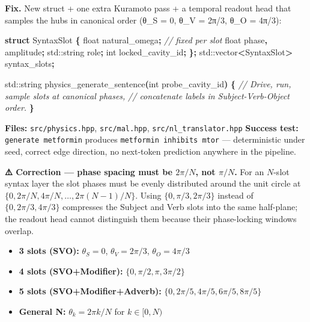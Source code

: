 \documentclass[
  11pt,
  a4paper,
]{article}
\newenvironment{Shaded}{\begin{snugshade}}{\end{snugshade}}
\newcommand{\BuiltInTok}[1]{#1}
\newcommand{\CommentTok}[1]{\textcolor[rgb]{0.56,0.35,0.01}{\textit{#1}}}
\newcommand{\DataTypeTok}[1]{\textcolor[rgb]{0.13,0.29,0.53}{#1}}
\newcommand{\KeywordTok}[1]{\textcolor[rgb]{0.13,0.29,0.53}{\textbf{#1}}}
\newcommand{\NormalTok}[1]{#1}
\newcommand{\OperatorTok}[1]{\textcolor[rgb]{0.81,0.36,0.00}{\textbf{#1}}}
\providecommand{\tightlist}{%
  \setlength{\itemsep}{0pt}\setlength{\parskip}{0pt}}
\begin{document}
\textbf{Fix.} New struct + one extra Kuramoto pass + a temporal readout
head that samples the hubs in canonical order (θ\_S = 0, θ\_V = 2π/3,
θ\_O = 4π/3):

\begin{Shaded}
\begin{Highlighting}[]
\KeywordTok{struct}\NormalTok{ SyntaxSlot }\OperatorTok{\{}
    \DataTypeTok{float}\NormalTok{ natural\_omega}\OperatorTok{;}   \CommentTok{// fixed per slot}
    \DataTypeTok{float}\NormalTok{ phase}\OperatorTok{,}\NormalTok{ amplitude}\OperatorTok{;}
    \BuiltInTok{std::}\NormalTok{string role}\OperatorTok{;}
    \DataTypeTok{int}\NormalTok{ locked\_cavity\_id}\OperatorTok{;}
\OperatorTok{\};}
\BuiltInTok{std::}\NormalTok{vector}\OperatorTok{\textless{}}\NormalTok{SyntaxSlot}\OperatorTok{\textgreater{}}\NormalTok{ syntax\_slots}\OperatorTok{;}

\BuiltInTok{std::}\NormalTok{string physics\_generate\_sentence}\OperatorTok{(}\DataTypeTok{int}\NormalTok{ probe\_cavity\_id}\OperatorTok{)} \OperatorTok{\{}
    \CommentTok{// Drive, run, sample slots at canonical phases,}
    \CommentTok{// concatenate labels in Subject{-}Verb{-}Object order.}
\OperatorTok{\}}
\end{Highlighting}
\end{Shaded}

\textbf{Files:} \texttt{src/physics.hpp}, \texttt{src/mal.hpp},
\texttt{src/nl\_translator.hpp} \textbf{Success test:}
\texttt{generate\ metformin} produces \texttt{metformin\ inhibits\ mtor}
--- deterministic under seed, correct edge direction, no next-token
prediction anywhere in the pipeline.

\textbf{⚠️ Correction --- phase spacing must be \(2\pi/N\), not
\(\pi/N\).} For an \(N\)-slot syntax layer the slot phases must be
evenly distributed around the unit circle at
\(\{0, 2\pi/N, 4\pi/N, \ldots, 2\pi(N-1)/N\}\). Using
\(\{0, \pi/3, 2\pi/3\}\) instead of \(\{0, 2\pi/3, 4\pi/3\}\) compresses
the Subject and Verb slots into the same half-plane; the readout head
cannot distinguish them because their phase-locking windows overlap.

\begin{itemize}
\tightlist
\item
  \textbf{3 slots (SVO):} \(\theta_S = 0\), \(\theta_V = 2\pi/3\),
  \(\theta_O = 4\pi/3\)
\item
  \textbf{4 slots (SVO+Modifier):} \(\{0, \pi/2, \pi, 3\pi/2\}\)
\item
  \textbf{5 slots (SVO+Modifier+Adverb):}
  \(\{0, 2\pi/5, 4\pi/5, 6\pi/5, 8\pi/5\}\)
\item
  \textbf{General N:} \(\theta_k = 2\pi k / N\) for \(k \in [0, N)\)
\end{itemize}
\end{document}
